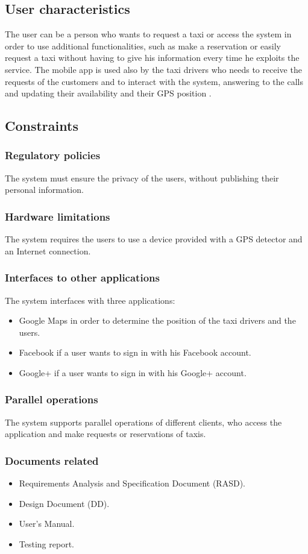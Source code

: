 \documentclass[18pt,oneside,a4paper, titlepage]{article}
\begin{document}
	\subsection{User characteristics}
	The user can be a person who wants to request a taxi or access the system in order to use additional functionalities, such as make a reservation or easily request a taxi without having to give his information every time he exploits the service.
	The mobile app is used also by the taxi drivers who needs to receive the requests of the customers and to interact with the system, answering to the calls and updating their availability and their GPS position .
	
	\subsection{Constraints}
		\subsubsection{Regulatory policies}
		The system must ensure the privacy of the users, without publishing their personal information.
		\subsubsection{Hardware limitations}
		The system requires the users to use a device provided with a GPS detector and an Internet connection.
		\subsubsection{Interfaces to other applications}
		The system interfaces with three applications:
		\begin{itemize}
			\item Google Maps in order to determine the position of the taxi drivers and the users.
			\item Facebook if a user wants to sign in with his Facebook account.
			\item Google+ if a user wants to sign in with his Google+ account.
		\end{itemize}
		\subsubsection{Parallel operations}
			The system supports parallel operations of different clients, who access the application and make requests or reservations of taxis.
		
		\subsubsection{Documents related}
			\begin{itemize}
				\item Requirements Analysis and Specification Document (RASD).
				\item Design Document (DD).
				\item User's Manual.
				\item Testing report.
			\end{itemize}
		
\end{document}
